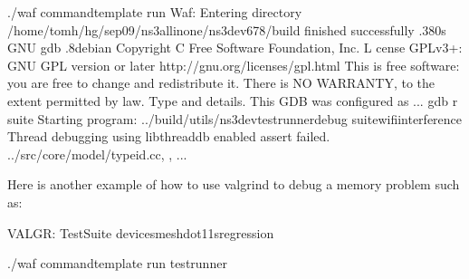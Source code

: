 \documentclass[letterpaper,10pt,english]{sphinxmanual}
\begin{document}
\begin{sphinxVerbatim}[commandchars=\\\{\}]
\PYGZdl{} ./waf \PYGZhy{}\PYGZhy{}command\PYGZhy{}template \PYGZhy{}\PYGZhy{}run 
Waf: Entering directory /home/tomh/hg/sep09/ns\PYGZhy{}3\PYGZhy{}allinone/ns\PYGZhy{}3\PYGZhy{}dev\PYGZhy{}678/build
 finished successfully .380s
GNU gdb .8\PYGZhy{}debian
Copyright C  Free Software Foundation, Inc.
L cense GPLv3+: GNU GPL version  or later \PYGZlt{}http://gnu.org/licenses/gpl.html\PYGZgt{}
This is free software: you are free to change and redistribute it.
There is NO WARRANTY, to the extent permitted by law.  Type 
and   details.
This GDB was configured as ...
gdb r \PYGZhy{}\PYGZhy{}suite
Starting program: \PYGZlt{}..\PYGZgt{}/build/utils/ns3\PYGZhy{}dev\PYGZhy{}test\PYGZhy{}runner\PYGZhy{}debug \PYGZhy{}\PYGZhy{}suitewifi\PYGZhy{}interference
\PYG{o}{[}Thread debugging using libthread\PYGZus{}db enabled\PYG{o}{]}
assert failed. ../src/core/model/type\PYGZhy{}id.cc, , 
...
\end{sphinxVerbatim}

Here is another example of how to use valgrind to debug a memory problem
such as:

\begin{sphinxVerbatim}[commandchars=\\\{\}]
VALGR: TestSuite devices\PYGZhy{}mesh\PYGZhy{}dot11s\PYGZhy{}regression

\PYGZdl{} ./waf \PYGZhy{}\PYGZhy{}command\PYGZhy{}template \PYGZhy{}\PYGZhy{}run test\PYGZhy{}runner
\end{sphinxVerbatim}
\end{document}
